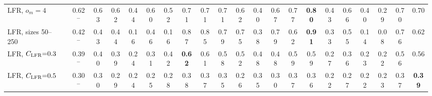 \begin{table}[p]
{\begin{tabular}{llcccc|cc|cccccc|cccccccc}
LFR, $o_m{=}4$ &  & 0.62$^{-}$ & 0.63 & 0.62 & 0.44 & 0.60 & 0.52 & 0.71 & 0.71 & 0.71 & 0.62 & 0.40 & 0.67 & 0.77 & \textbf{0.80} & 0.43 & 0.66 & 0.40 & 0.29 & 0.70 & 0.70 \\
LFR, sizes 50--250 &  & 0.42$^{-}$ & 0.43 & 0.44 & 0.16 & 0.46 & 0.16 & 0.87 & 0.85 & 0.79 & 0.75 & 0.38 & 0.79 & 0.62 & \textbf{0.91} & 0.33 & 0.55 & 0.14 & 0.08 & 0.76 & 0.62 \\
LFR, $C_{\rm LFR}{=}0.3$ &  & 0.39$^{-}$ & 0.40 & 0.39 & 0.24 & 0.31 & 0.42 & \textbf{0.62} & 0.61 & 0.58 & 0.52 & 0.48 & 0.48 & 0.59 & 0.59 & 0.27 & 0.36 & 0.23 & 0.22 & 0.56 & 0.56 \\
LFR, $C_{\rm LFR}{=}0.5$ &  & 0.30$^{-}$ & 0.30 & 0.29 & 0.24 & 0.25 & 0.28 & 0.38 & 0.37 & 0.35 & 0.26 & 0.35 & 0.30 & 0.37 & 0.36 & 0.22 & 0.27 & 0.22 & 0.23 & 0.37 & \textbf{0.39} \\
\hline\hline
\end{tabular}}
\end{table}

